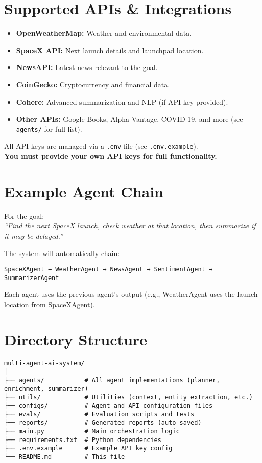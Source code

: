 \documentclass[12pt]{article}
\begin{document}
\section{Supported APIs \& Integrations}

\begin{itemize}
    \item \textbf{OpenWeatherMap:} Weather and environmental data.
    \item \textbf{SpaceX API:} Next launch details and launchpad location.
    \item \textbf{NewsAPI:} Latest news relevant to the goal.
    \item \textbf{CoinGecko:} Cryptocurrency and financial data.
    \item \textbf{Cohere:} Advanced summarization and NLP (if API key provided).
    \item \textbf{Other APIs:} Google Books, Alpha Vantage, COVID-19, and more (see \texttt{agents/} for full list).
\end{itemize}

All API keys are managed via a \texttt{.env} file (see \texttt{.env.example}). \\
\textbf{You must provide your own API keys for full functionality.}

\section{Example Agent Chain}

For the goal: \\
\textit{``Find the next SpaceX launch, check weather at that location, then summarize if it may be delayed.''}

The system will automatically chain:
\begin{verbatim}
SpaceXAgent → WeatherAgent → NewsAgent → SentimentAgent → SummarizerAgent
\end{verbatim}
Each agent uses the previous agent's output (e.g., WeatherAgent uses the launch location from SpaceXAgent).

\section{Directory Structure}

\begin{verbatim}
multi-agent-ai-system/
│
├── agents/           # All agent implementations (planner, enrichment, summarizer)
├── utils/            # Utilities (context, entity extraction, etc.)
├── configs/          # Agent and API configuration files
├── evals/            # Evaluation scripts and tests
├── reports/          # Generated reports (auto-saved)
├── main.py           # Main orchestration logic
├── requirements.txt  # Python dependencies
├── .env.example      # Example API key config
└── README.md         # This file
\end{verbatim}
\end{document}
